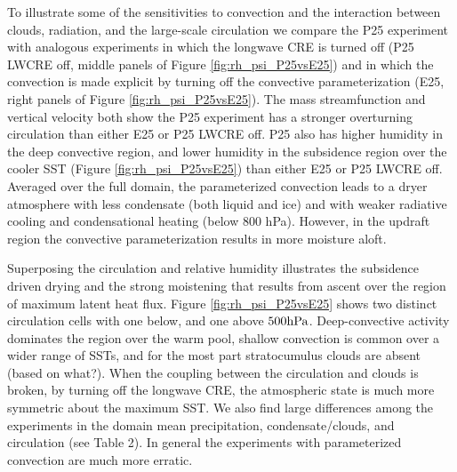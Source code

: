 \documentclass[draft]{agujournal2019}
\begin{document}
To illustrate some of the sensitivities to convection and the interaction between clouds, radiation, and the large-scale 
circulation we compare the P25 experiment with analogous experiments in which the longwave CRE is turned 
off (P25 LWCRE off, middle 
panels of Figure \ref{fig:rh_psi_P25vsE25}) and in which the convection is made explicit by turning off the convective 
parameterization (E25, right panels of Figure \ref{fig:rh_psi_P25vsE25}).  
The mass streamfunction and vertical velocity both show the P25 experiment has a stronger overturning circulation 
than either E25 or P25 LWCRE off.  P25 also has higher humidity in the deep convective region, and lower humidity in 
the subsidence region over the 
cooler SST (Figure \ref{fig:rh_psi_P25vsE25}) than either E25 or P25 LWCRE off.  Averaged over the full domain, 
the parameterized convection leads to a dryer atmosphere with less 
condensate (both liquid and ice) and with weaker radiative cooling and condensational heating (below 800 hPa).  
However, in the updraft region the convective parameterization results in more moisture aloft.      

Superposing the circulation and relative humidity illustrates the subsidence driven 
drying and the strong moistening that results from ascent over the region of maximum latent heat flux.  
Figure \ref{fig:rh_psi_P25vsE25} shows two distinct circulation cells with one below, and one above $500 \rm{hPa}$.  
Deep-convective activity dominates the 
region over the warm pool, shallow convection is common over a wider range of SSTs, and for the most part stratocumulus 
clouds are absent (based on what?).  When the coupling between the circulation and clouds is broken, by turning off the longwave CRE, 
the atmospheric state is much more symmetric about the maximum SST.  We also find large differences among the 
experiments in the domain mean precipitation, condensate/clouds, and circulation (see Table 2).  In general the 
experiments with parameterized convection are much more erratic.   
\end{document}
